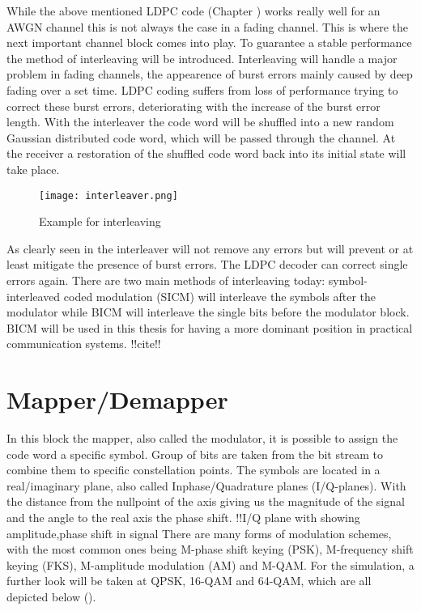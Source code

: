While the above mentioned \gls{LDPC} code (Chapter ) works really well for an AWGN channel this is not always the case in a fading channel. This is where the next important channel block comes into play. To guarantee a stable performance the method of interleaving will be introduced. Interleaving will handle a major problem in fading channels, the appearence of burst errors mainly caused by deep fading over a set time. \gls{LDPC} coding suffers from loss of performance trying to correct these burst errors, deteriorating with the increase of the burst error length. With the interleaver the code word will be shuffled into a new random Gaussian distributed code word, which will be passed through the channel. At the receiver a restoration of the shuffled code word back into its initial state will take place.
\begin{figure}[!htb]
	\centering
	\texttt{[image: interleaver.png]}
	\caption{Example for interleaving}
	\label{fig:interleaver}
\end{figure}
As clearly seen in  the interleaver will not remove any errors but will prevent or at least mitigate the presence of burst errors. The \gls{LDPC} decoder can correct single errors again. There are two main methods of interleaving today: symbol-interleaved coded modulation (SICM) will interleave the symbols after the modulator while \gls{BICM} will interleave the single bits before the modulator block. \gls{BICM} will be used in this thesis for having a more dominant position in practical communication systems. !!cite!!

\clearpage

\section{Mapper/Demapper}
\label{sec:mapper}

In this block the mapper, also called the modulator, it is possible to assign the code word a specific symbol. Group of bits are taken from the bit stream to combine them to specific constellation points. The symbols are located in a real/imaginary plane, also called Inphase/Quadrature planes (I/Q-planes). With the distance from the nullpoint of the axis giving us the magnitude of the signal and the angle to the real axis the phase shift. 
!!{I/Q plane with showing amplitude,phase shift in signal}
There are many forms of modulation schemes, with the most common ones being M-phase shift keying (PSK), M-frequency shift keying (FKS), M-amplitude modulation (AM) and M-\gls{QAM}. For the simulation, a further look will be taken at \gls{QPSK}, 16-\gls{QAM} and 64-\gls{QAM}, which are all depicted below ().

